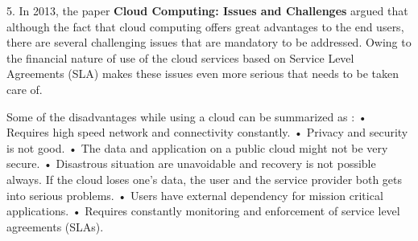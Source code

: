 \documentclass[a4paper,twoside]{scrbook}
\begin{document}
\begin{CJK}{UTF8}{gbsn}
5. In 2013, the paper \textbf{Cloud Computing: Issues and Challenges} argued that although the fact that cloud computing offers great advantages to the end users, there are several challenging issues that are mandatory to be addressed. Owing to the financial nature of use of the cloud services based on Service Level Agreements (SLA) makes these issues even more serious that needs to be taken care of.

Some of the disadvantages while using a cloud can be summarized as :
• Requires high speed network and connectivity constantly.
• Privacy and security is not good.
• The data and application on a public cloud might not be very secure.
• Disastrous situation are unavoidable and recovery is not possible always. If the cloud loses one’s data, the user and the service provider both gets into serious problems.
• Users have external dependency for mission critical applications.
•  Requires constantly monitoring and enforcement of service level agreements (SLAs).


\end{CJK}
\end{document}
